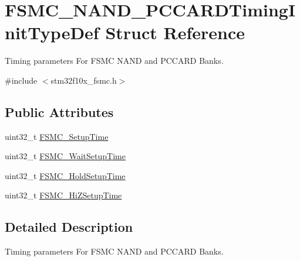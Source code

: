 \hypertarget{structFSMC__NAND__PCCARDTimingInitTypeDef}{
\section{FSMC\_\-NAND\_\-PCCARDTimingInitTypeDef Struct Reference}
\label{structFSMC__NAND__PCCARDTimingInitTypeDef}
}


Timing parameters For FSMC NAND and PCCARD Banks.  




{\ttfamily \#include $<$stm32f10x\_\-fsmc.h$>$}

\subsection*{Public Attributes}
\begin{DoxyCompactItemize}
\item 
uint32\_\-t \hyperlink{structFSMC__NAND__PCCARDTimingInitTypeDef_a31632aeb49269a29a39e3b191590b6dc}{FSMC\_\-SetupTime}
\item 
uint32\_\-t \hyperlink{structFSMC__NAND__PCCARDTimingInitTypeDef_a99a7d54ed2674faa5a4e0f2669812855}{FSMC\_\-WaitSetupTime}
\item 
uint32\_\-t \hyperlink{structFSMC__NAND__PCCARDTimingInitTypeDef_ae2b53c2cfd55ff277f453613dcf7c8b2}{FSMC\_\-HoldSetupTime}
\item 
uint32\_\-t \hyperlink{structFSMC__NAND__PCCARDTimingInitTypeDef_a8a2a2a9e71dbf276fddad2bb32c0d256}{FSMC\_\-HiZSetupTime}
\end{DoxyCompactItemize}


\subsection{Detailed Description}
Timing parameters For FSMC NAND and PCCARD Banks. 


